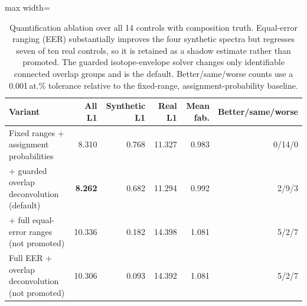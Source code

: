 \begin{table}[t]
\centering
\caption{Quantification ablation over all 14 controls with composition
truth. Equal-error ranging (EER) substantially improves the four
synthetic spectra but regresses seven of ten real controls, so it is
retained as a shadow estimate rather than promoted. The guarded
isotope-envelope solver changes only identifiable connected overlap
groups and is the default. Better/same/worse counts use a 0.001\,at.\%
tolerance relative to the fixed-range, assignment-probability baseline.}
\label{tab:quantification_ablation}
\small
\begin{adjustbox}{max width=\textwidth}
\begin{tabular}{lrrrrr}
\toprule
Variant & All L1 & Synthetic L1 & Real L1 & Mean fab. & Better/same/worse \\
\midrule
Fixed ranges + assignment probabilities & 8.310 & 0.768 & 11.327 & 0.983 & 0/14/0 \\
+ guarded overlap deconvolution (default) & \textbf{8.262} & 0.682 & 11.294 & 0.992 & 2/9/3 \\
+ full equal-error ranges (not promoted) & 10.336 & 0.182 & 14.398 & 1.081 & 5/2/7 \\
Full EER + overlap deconvolution (not promoted) & 10.306 & 0.093 & 14.392 & 1.081 & 5/2/7 \\
\bottomrule
\end{tabular}
\end{adjustbox}
\end{table}
